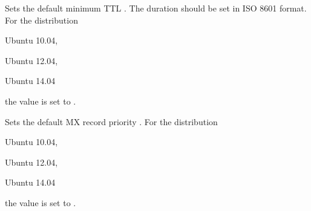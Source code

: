 
Sets the default minimum TTL . The duration should be set in 
ISO 8601 format.
For the distribution
\begin{inparaitem}
\item[\TheDistribution{ubuntu}] Ubuntu 10.04,
\item[\TheDistribution{ubuntu}] Ubuntu 12.04,
\item[\TheDistribution{ubuntu}] Ubuntu 14.04
\end{inparaitem}
the value is set to .


Sets the default MX record priority .
For the distribution
\begin{inparaitem}
\item[\TheDistribution{ubuntu}] Ubuntu 10.04,
\item[\TheDistribution{ubuntu}] Ubuntu 12.04,
\item[\TheDistribution{ubuntu}] Ubuntu 14.04
\end{inparaitem}
the value is set to .
